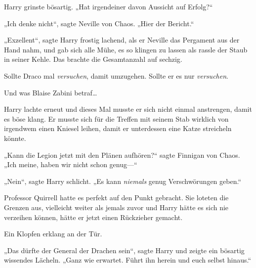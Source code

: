 Harry grinste bösartig. „Hat irgendeiner davon Aussicht auf Erfolg?“

„Ich denke nicht“, sagte Neville von Chaos. „Hier der Bericht.“

„Exzellent“, sagte Harry frostig lachend, als er Neville das Pergament aus der Hand nahm, und gab sich alle Mühe, es so klingen zu lassen als rassle der Staub in seiner Kehle. Das brachte die Gesamtanzahl auf sechzig.

Sollte Draco mal \emph{versuchen}, damit umzugehen. Sollte er es nur \emph{versuchen}.

Und was Blaise Zabini betraf…

Harry lachte erneut und dieses Mal musste er sich nicht einmal anstrengen, damit es böse klang. Er musste sich für die Treffen mit seinem Stab wirklich von irgendwem einen Kniesel leihen, damit er unterdessen eine Katze streicheln könnte.

„Kann die Legion jetzt mit den Plänen aufhören?“ sagte Finnigan von Chaos. „Ich meine, haben wir nicht schon genug—“

„Nein“, sagte Harry schlicht. „Es kann \emph{niemals} genug Verschwörungen geben.“

Professor Quirrell hatte es perfekt auf den Punkt gebracht. Sie loteten die Grenzen aus, vielleicht weiter als jemals zuvor und Harry hätte es sich nie verzeihen können, hätte er jetzt einen Rückzieher gemacht.

Ein Klopfen erklang an der Tür.

„Das dürfte der General der Drachen sein“, sagte Harry und zeigte ein bösartig wissendes Lächeln. „Ganz wie erwartet. Führt ihn herein und euch selbst hinaus.“

